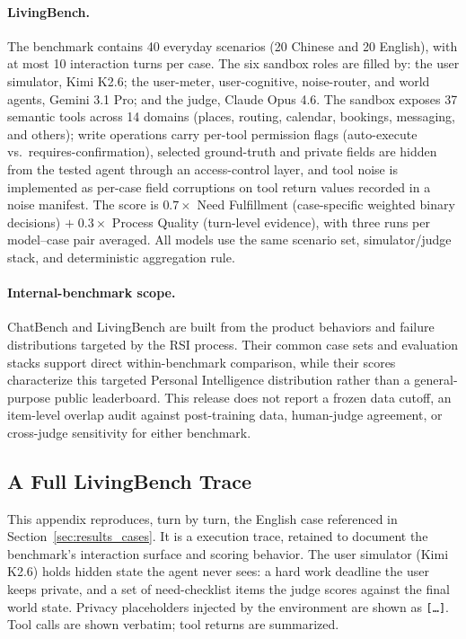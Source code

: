 \paragraph{LivingBench.} The benchmark contains 40 everyday scenarios (20 Chinese and 20 English), with at most 10 interaction turns per case. The six sandbox roles are filled by: the user simulator, Kimi K2.6; the user-meter, user-cognitive, noise-router, and world agents, Gemini 3.1 Pro; and the judge, Claude Opus 4.6. The sandbox exposes 37 semantic tools across 14 domains (places, routing, calendar, bookings, messaging, and others); write operations carry per-tool permission flags (auto-execute vs.\ requires-confirmation), selected ground-truth and private fields are hidden from the tested agent through an access-control layer, and tool noise is implemented as per-case field corruptions on tool return values recorded in a noise manifest. The score is $0.7\times$ Need Fulfillment (case-specific weighted binary decisions) $+\;0.3\times$ Process Quality (turn-level evidence), with three runs per model--case pair averaged. All models use the same scenario set, simulator/judge stack, and deterministic aggregation rule.

\paragraph{Internal-benchmark scope.} ChatBench and LivingBench are built from the product behaviors and failure distributions targeted by the RSI process. Their common case sets and evaluation stacks support direct within-benchmark comparison, while their scores characterize this targeted Personal Intelligence distribution rather than a general-purpose public leaderboard. This release does not report a frozen data cutoff, an item-level overlap audit against post-training data, human-judge agreement, or cross-judge sensitivity for either benchmark.

\subsection{A Full LivingBench Trace}
\label{app:livingbench_trace}

This appendix reproduces, turn by turn, the English case referenced in Section~\ref{sec:results_cases}. It is a \venti{} execution trace, retained to document the benchmark's interaction surface and scoring behavior. The user simulator (Kimi K2.6) holds hidden state the agent never sees: a hard work deadline the user keeps private, and a set of need-checklist items the judge scores against the final world state. Privacy placeholders injected by the environment are shown as \texttt{[\ldots]}. Tool calls are shown verbatim; tool returns are summarized.

